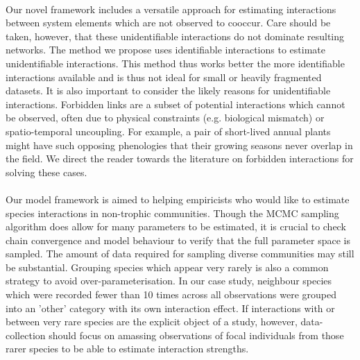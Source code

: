 \documentclass[a4,12pt]{article}
\begin{document}
        
        \paragraph{}
        Our novel framework includes a versatile approach for estimating interactions between system elements which are not observed to cooccur. Care should be taken, however, that these unidentifiable interactions do not dominate resulting networks. The method we propose uses identifiable interactions to estimate unidentifiable interactions. This method thus works better the more identifiable interactions available and is thus not ideal for small or heavily fragmented datasets. It is also important to consider the likely reasons for unidentifiable interactions. Forbidden links are a subset of potential interactions which cannot be observed, often due to physical constraints (e.g. biological mismatch) or spatio-temporal uncoupling. For example, a pair of short-lived annual plants might have such opposing phenologies that their growing seasons never overlap in the field. We direct the reader towards the literature on forbidden interactions \parencite{Olesen2011, Jordano2016} for solving these cases. 


        \paragraph{}
        Our model framework is aimed to helping empiricists who would like to estimate species interactions in non-trophic communities. Though the MCMC sampling algorithm does allow for many parameters to be estimated, it is crucial to check chain convergence and model behaviour to verify that the full parameter space is sampled. The amount of data required for sampling diverse communities may still be substantial. Grouping species which appear very rarely is also a common strategy to avoid over-parameterisation. In our case study, neighbour species which were recorded fewer than 10 times across all observations were grouped into an 'other' category with its own interaction effect. If interactions with or between very rare species are the explicit object of a study, however, data-collection should focus on amassing observations of focal individuals from those rarer species to be able to estimate  interaction strengths.   
\end{document}
